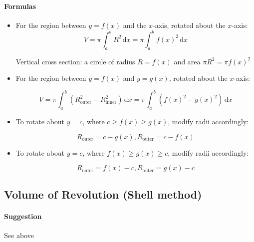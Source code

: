 \documentclass[11pt]{article}
\begin{document}
		\paragraph{Formulas} 
					\begin{itemize}
					\item For the region between $y = f(x)$ and the $x$-axis, rotated about the $x$-axis:
						\begin{equation*}
							V = \pi\int_a^b \! R^2 \, \mathrm{d}x = \pi\int_a^b \! f(x)^2 \, \mathrm{d}x
						\end{equation*}
						
						\begin{flushright}
							 Vertical cross section: a circle of radius $R = f(x)$ and area $\pi R^2 = \pi f(x)^2$
						\end{flushright}
					\item For the region between $y = f(x)$ and $y = g(x)$, rotated about the $x$-axis:
						
						\begin{equation*}
							V = \pi\int_a^b \! (R_{\mathrm{outer}}^2 - R_{\mathrm{inner}}^2) \, \mathrm{d}x = 
							\pi\int_a^b \! (f(x)^2 - g(x)^2) \, \mathrm{d}x
						\end{equation*}
						
					\item To rotate about $y = c$, where $ c\ge f(x) \ge g(x)$, modify radii accordingly:
						
						\begin{equation*}
							R_{\mathrm{outer}} = c - g(x), R_{\mathrm{outer}} = c - f(x)
						\end{equation*}
						
					\item To rotate about $y = c$, where $ f(x) \ge g(x) \ge c$, modify radii accordingly:
						
						\begin{equation*}
							R_{\mathrm{outer}} = f(x) - c, R_{\mathrm{outer}} = g(x) - c
						\end{equation*}
					
					\end {itemize}
			\pagebreak		
				
	\subsection{Volume of Revolution (Shell method)}
		\paragraph{Suggestion} See above
\end{document}
